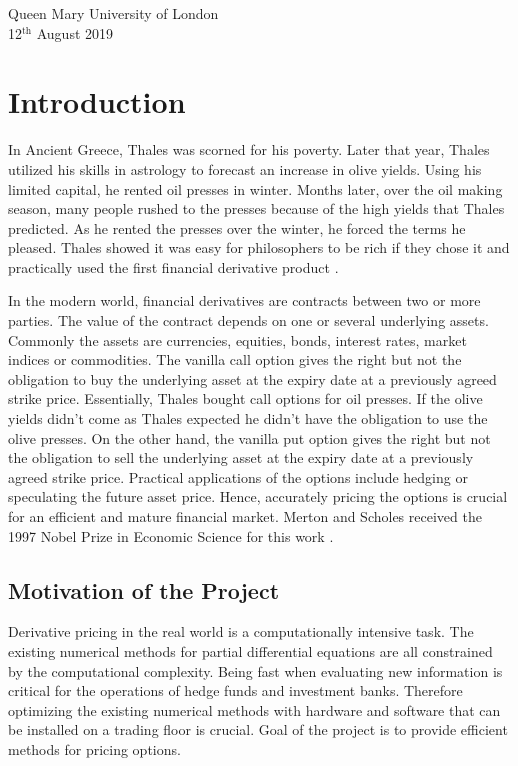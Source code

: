 \documentclass[12pt, oneside]{book}
\theoremstyle{plain}
\theoremstyle{definition}
\begin{document}
\begin{flushright}
Queen Mary University of London\\
12${}^{\text{th}}$ August 2019
\end{flushright}

\tableofcontents

\chapter{Introduction}
In Ancient Greece, Thales was scorned for his poverty. Later that year, Thales utilized his skills in astrology to forecast an increase in olive yields. Using his limited capital, he rented oil presses in winter. Months later, over the oil making season, many people rushed to the presses because of the high yields that Thales predicted. As he rented the presses over the winter, he forced the terms he pleased. Thales showed it was easy for philosophers to be rich if they chose it and practically used the first  financial derivative product \cite{thalesians}. 

In the modern world, financial derivatives are contracts between two or more parties. The value of the contract depends on one or several underlying assets. Commonly the assets are currencies, equities, bonds, interest rates, market indices or commodities. The vanilla call option gives the right but not the obligation to buy the underlying asset at the expiry date at a previously agreed strike price. Essentially, Thales bought call options for oil presses.  If the olive yields didn't come as Thales expected he didn't have the obligation to use the olive presses.  On the other hand, the vanilla put option gives the right but not the obligation to sell the underlying asset at the expiry date at a previously agreed strike price. Practical applications of the options include hedging or speculating the future asset price. Hence, accurately pricing the options is crucial for an efficient and mature financial market. Merton and Scholes received the 1997 Nobel Prize in Economic Science for this work \cite{merton}. 

\section{Motivation of the Project}
Derivative pricing in the real world is a computationally intensive task. The existing numerical methods for partial differential equations are all constrained by the computational complexity. Being fast when evaluating new information is critical for the operations of hedge funds and investment banks. Therefore optimizing the existing numerical methods with hardware and software that can be installed on a trading floor is crucial. Goal of the project is to provide efficient methods for pricing options.
\end{document}
